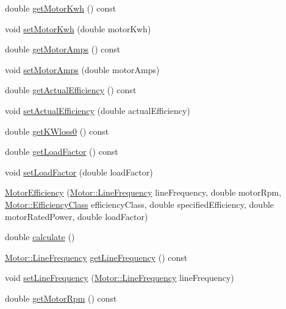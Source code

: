 \begin{DoxyCompactItemize}
\item 
double \hyperlink{class_motor_efficiency_a4d21d0c44ee00f5d097b0acbcb73a8d8}{get\+Motor\+Kwh} () const
\item 
void \hyperlink{class_motor_efficiency_ab1c7507bac259565e43a6777d079148b}{set\+Motor\+Kwh} (double motor\+Kwh)
\item 
double \hyperlink{class_motor_efficiency_a955906509a4b49274b35c1b119c4a4b4}{get\+Motor\+Amps} () const
\item 
void \hyperlink{class_motor_efficiency_ac86aa8d6162e63eb440e07e557534c74}{set\+Motor\+Amps} (double motor\+Amps)
\item 
double \hyperlink{class_motor_efficiency_ae40031307b8631cf40df1c4069069dc0}{get\+Actual\+Efficiency} () const
\item 
void \hyperlink{class_motor_efficiency_a7a5ad8d01fdc0a3bf93d952752487496}{set\+Actual\+Efficiency} (double actual\+Efficiency)
\item 
double \hyperlink{class_motor_efficiency_a47398ac8203f5b79a0ca435673a4bc16}{get\+K\+Wloss0} () const
\item 
double \hyperlink{class_motor_efficiency_abff38d95856c3d33c9c48c45e77e8899}{get\+Load\+Factor} () const
\item 
void \hyperlink{class_motor_efficiency_ad6a7b0eb436378f36ceb8a0cec121786}{set\+Load\+Factor} (double load\+Factor)
\item 
\hyperlink{class_motor_efficiency_ab8d410693e778a2cb2d5a112cc1a4202}{Motor\+Efficiency} (\hyperlink{class_motor_acee1bdf1b684ad36cb80dc2829d9fcee}{Motor\+::\+Line\+Frequency} line\+Frequency, double motor\+Rpm, \hyperlink{class_motor_afa022971ae062406a9f588c601673d4e}{Motor\+::\+Efficiency\+Class} efficiency\+Class, double specified\+Efficiency, double motor\+Rated\+Power, double load\+Factor)
\item 
double \hyperlink{class_motor_efficiency_a448092c19177f5fff0c011f0c9398db0}{calculate} ()
\item 
\hyperlink{class_motor_acee1bdf1b684ad36cb80dc2829d9fcee}{Motor\+::\+Line\+Frequency} \hyperlink{class_motor_efficiency_a3cc0ed606154a04d035399e05d1cb02a}{get\+Line\+Frequency} () const
\item 
void \hyperlink{class_motor_efficiency_a993b09941d330d3a46e0d72bd6dc65bb}{set\+Line\+Frequency} (\hyperlink{class_motor_acee1bdf1b684ad36cb80dc2829d9fcee}{Motor\+::\+Line\+Frequency} line\+Frequency)
\item 
double \hyperlink{class_motor_efficiency_ab29655f487e90a73246be6e9bc67c36a}{get\+Motor\+Rpm} () const

\end{DoxyCompactItemize}
